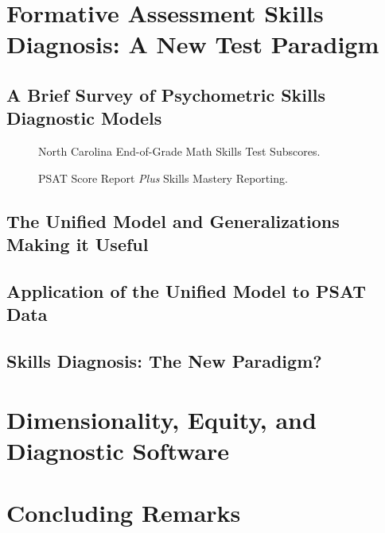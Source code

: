 \documentclass[titlepage,11pt,twoside]{article}
\begin{document}
\section{Formative Assessment Skills Diagnosis: A New Test Paradigm}



\subsection{A Brief Survey of Psychometric Skills Diagnostic Models}



\begin{figure}[h]
\caption{North Carolina End-of-Grade Math Skills Test Subscores.}
\end{figure}



\begin{figure}[h]
\caption{PSAT Score Report \textit{Plus} Skills Mastery Reporting.}
\end{figure}




\subsection{The Unified Model and Generalizations Making it Useful}



\subsection{Application of the Unified Model to PSAT Data}


\subsection{Skills Diagnosis: The New Paradigm?}


\section{Dimensionality, Equity, and Diagnostic Software}


\section{Concluding Remarks}

\vspace{\fill}\clearpage
\end{document}
